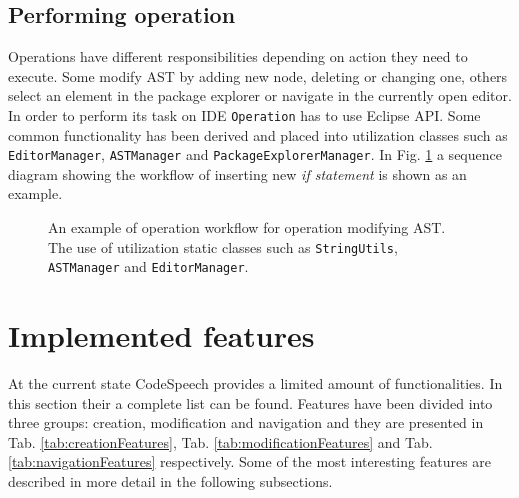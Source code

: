 \subsection{Performing operation}

Operations have different responsibilities depending on action they need to execute. Some modify AST by adding new node, deleting or changing one, others select an element in the package explorer or navigate in the currently open editor. In order to perform its task on IDE \texttt{Operation} has to use Eclipse API. Some common functionality has been derived and placed into utilization classes such as \texttt{EditorManager}, \texttt{ASTManager} and \texttt{PackageExplorerManager}. In Fig. \ref{fig:sequenceOperation} a sequence diagram showing the workflow of inserting new \textit{if statement} is shown as an example.

\begin{figure}
    \centering
    \caption{An example of operation workflow for operation modifying AST. The use of utilization static classes such as \texttt{StringUtils}, \texttt{ASTManager} and \texttt{EditorManager}.}
    \label{fig:sequenceOperation}
\end{figure}

\section{Implemented features}
At the current state CodeSpeech provides a limited amount of functionalities. In this section their a complete list can be found. Features have been divided into three groups: creation, modification and navigation and they are presented in Tab. \ref{tab:creationFeatures}, Tab. \ref{tab:modificationFeatures} and Tab. \ref{tab:navigationFeatures} respectively. Some of the most interesting features are described in more detail in the following subsections.

